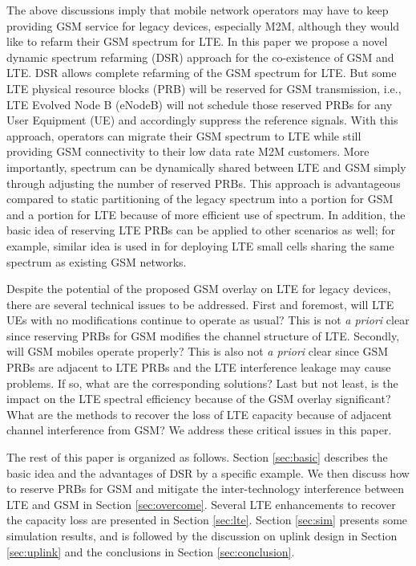 \documentclass[10pt,journal]{IEEEtran}
\theoremstyle{slplain}
\begin{document}
The above discussions imply that mobile network operators may have to keep providing GSM service for legacy devices, especially M2M, although they would like to refarm their GSM spectrum for LTE. In this paper we propose a novel  dynamic spectrum refarming (DSR) approach  for the co-existence of GSM and LTE. DSR allows complete refarming of the GSM spectrum for LTE. But some LTE physical resource blocks (PRB) will be reserved for GSM transmission, i.e., LTE Evolved Node B (eNodeB) will not schedule those reserved PRBs for any User Equipment (UE) and accordingly suppress the reference signals.  With this approach, operators can migrate their GSM spectrum to LTE while still providing GSM connectivity to their low data rate M2M customers. More importantly, spectrum can be dynamically shared between LTE and GSM simply through adjusting the number of reserved PRBs. This approach is advantageous compared to static partitioning of the legacy spectrum into a portion for GSM and a portion for LTE because of more efficient use of spectrum. In addition, the basic idea of reserving LTE PRBs can be applied to other scenarios as well; for example, similar idea is used in \cite{lin2013dynamic} for deploying LTE small cells sharing the same spectrum as existing GSM networks. 



Despite the potential of the proposed GSM overlay on LTE for legacy devices, there are several technical issues to be addressed. First and foremost, will LTE UEs with no modifications continue to operate as usual? This is not \textit{a priori} clear since reserving PRBs for GSM modifies the channel structure of LTE. Secondly, will GSM mobiles operate properly? This is also not \textit{a priori} clear since GSM PRBs are adjacent to LTE PRBs  and the LTE interference leakage may cause problems. If so, what are the corresponding solutions? Last but not least, is the impact on the LTE spectral efficiency because of the GSM overlay significant? What are the methods to recover the loss of LTE capacity because of adjacent channel interference from GSM?  We address these critical issues in this paper.




The rest of this paper is organized as follows. Section \ref{sec:basic} describes the basic idea and the advantages of DSR by a specific example. We then discuss how to reserve PRBs for GSM and mitigate the inter-technology interference between LTE and GSM in Section \ref{sec:overcome}. Several LTE enhancements to recover the capacity loss  are presented  in Section \ref{sec:lte}. Section \ref{sec:sim} presents some simulation results, and is followed by the discussion on uplink design in Section \ref{sec:uplink} and the conclusions in Section \ref{sec:conclusion}.
\end{document}
